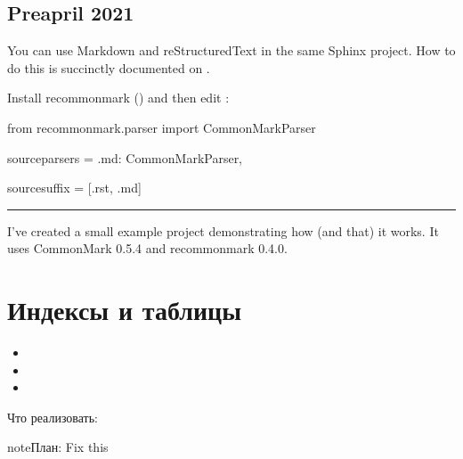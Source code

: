 \documentclass[twoside,11pt,a4paper,notitlepage]{report}
\begin{document}
\section{Pre\sphinxhyphen{}april 2021}
\label{\detokenize{test:pre-april-2021}}
\sphinxAtStartPar
You can use Markdown and reStructuredText in the same Sphinx project. How to do this is succinctly documented on .

\sphinxAtStartPar
Install recommonmark () and then edit :

\begin{sphinxVerbatim}[commandchars=\\\{\}]
from recommonmark.parser import CommonMarkParser

source\PYGZus{}parsers = \PYGZob{}
    \PYGZsq{}.md\PYGZsq{}: CommonMarkParser,
\PYGZcb{}

source\PYGZus{}suffix = [\PYGZsq{}.rst\PYGZsq{}, \PYGZsq{}.md\PYGZsq{}]
\end{sphinxVerbatim}


\bigskip\hrule\bigskip


\sphinxAtStartPar
I’ve created a small example project  demonstrating how (and that) it works. It uses CommonMark 0.5.4 and recommonmark 0.4.0.


\chapter{Индексы и таблицы}
\label{\detokenize{index:id1}}\begin{itemize}
\item {} 
\sphinxAtStartPar
{}

\item {} 
\sphinxAtStartPar
{}

\item {} 
\sphinxAtStartPar
{}

\end{itemize}

\sphinxAtStartPar
Что реализовать:

\begin{sphinxadmonition}{note}{План:}
\sphinxAtStartPar
Fix this
\end{sphinxadmonition}
\end{document}
